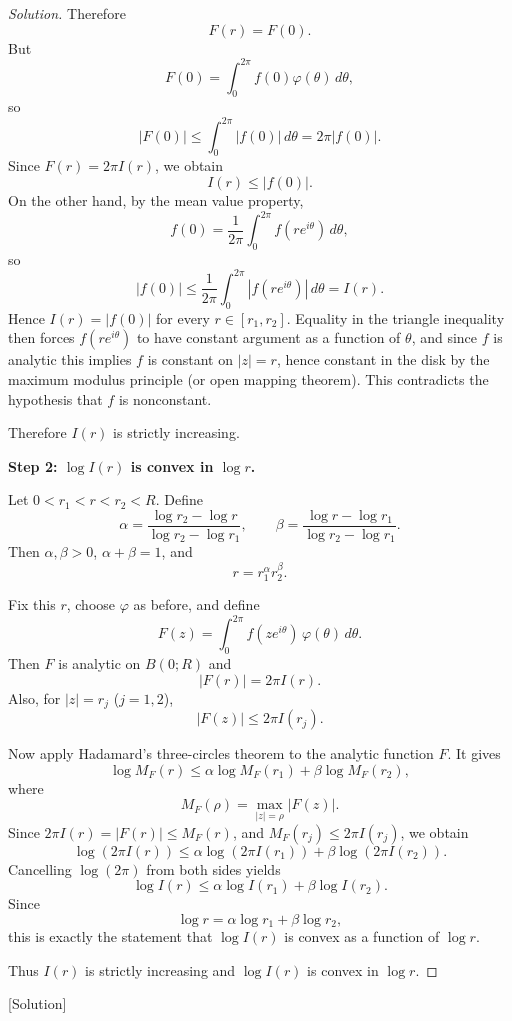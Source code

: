 \documentclass[12pt, a4paper]{report}
\theoremstyle{spaced}
\begin{document}
\begin{proof}[Solution]
	Therefore
	\[
		F(r)=F(0).
	\]
	But
	\[
		F(0)=\int_0^{2\pi} f(0)\varphi(\theta)\,d\theta,
	\]
	so
	\[
		|F(0)|\le \int_0^{2\pi} |f(0)|\,d\theta = 2\pi |f(0)|.
	\]
	Since \(F(r)=2\pi I(r)\), we obtain
	\[
		I(r)\le |f(0)|.
	\]
	On the other hand, by the mean value property,
	\[
		f(0)=\frac1{2\pi}\int_0^{2\pi} f(re^{i\theta})\,d\theta,
	\]
	so
	\[
		|f(0)|\le \frac1{2\pi}\int_0^{2\pi}|f(re^{i\theta})|\,d\theta = I(r).
	\]
	Hence \(I(r)=|f(0)|\) for every \(r\in[r_1,r_2]\). Equality in the triangle inequality then forces \(f(re^{i\theta})\) to have constant argument as a function of \(\theta\), and since \(f\) is analytic this implies \(f\) is constant on \(|z|=r\), hence constant in the disk by the maximum modulus principle (or open mapping theorem). This contradicts the hypothesis that \(f\) is nonconstant.

	Therefore \(I(r)\) is strictly increasing.

	\medskip
	\textbf{Step 2: \(\log I(r)\) is convex in \(\log r\).}

	Let \(0<r_1<r<r_2<R\). Define
	\[
		\alpha=\frac{\log r_2-\log r}{\log r_2-\log r_1},
		\qquad
		\beta=\frac{\log r-\log r_1}{\log r_2-\log r_1}.
	\]
	Then \(\alpha,\beta>0\), \(\alpha+\beta=1\), and
	\[
		r=r_1^\alpha r_2^\beta.
	\]

	Fix this \(r\), choose \(\varphi\) as before, and define
	\[
		F(z)=\int_0^{2\pi} f(ze^{i\theta})\,\varphi(\theta)\,d\theta.
	\]
	Then \(F\) is analytic on \(B(0;R)\) and
	\[
		|F(r)|=2\pi I(r).
	\]
	Also, for \(|z|=r_j\) (\(j=1,2\)),
	\[
		|F(z)|\le 2\pi I(r_j).
	\]

	Now apply Hadamard's three-circles theorem to the analytic function \(F\). It gives
	\[
		\log M_F(r)\le \alpha \log M_F(r_1)+\beta \log M_F(r_2),
	\]
	where
	\[
		M_F(\rho)=\max_{|z|=\rho}|F(z)|.
	\]
	Since \(2\pi I(r)=|F(r)|\le M_F(r)\), and \(M_F(r_j)\le 2\pi I(r_j)\), we obtain
	\[
		\log(2\pi I(r))
		\le \alpha \log(2\pi I(r_1))+\beta \log(2\pi I(r_2)).
	\]
	Cancelling \(\log(2\pi)\) from both sides yields
	\[
		\log I(r)\le \alpha \log I(r_1)+\beta \log I(r_2).
	\]
	Since
	\[
		\log r=\alpha \log r_1+\beta \log r_2,
	\]
	this is exactly the statement that \(\log I(r)\) is convex as a function of \(\log r\).

	Thus \(I(r)\) is strictly increasing and \(\log I(r)\) is convex in \(\log r\).
\end{proof}[Solution]
\end{document}
